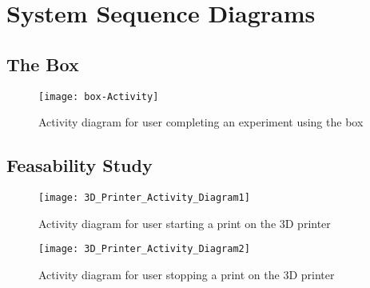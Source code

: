 \chapter{System Sequence Diagrams}

\section{The Box}

\begin{figure}[H]
\texttt{[image: box-Activity]}
\caption{\label{figure:box-activitu} Activity diagram for user completing an experiment using the box}
\end{figure}



\section{Feasability Study}
\begin{figure}[H]
\texttt{[image: 3D\_Printer\_Activity\_Diagram1]}
\caption{\label{figure:3D_Printer_Activity_Diagram1} Activity diagram for user starting a print on the 3D printer}
\end{figure}

\begin{figure}[H]
\texttt{[image: 3D\_Printer\_Activity\_Diagram2]}
\caption{\label{figure:3D_Printer_Activity_Diagram2} Activity diagram for user stopping a print on the 3D printer}
\end{figure}